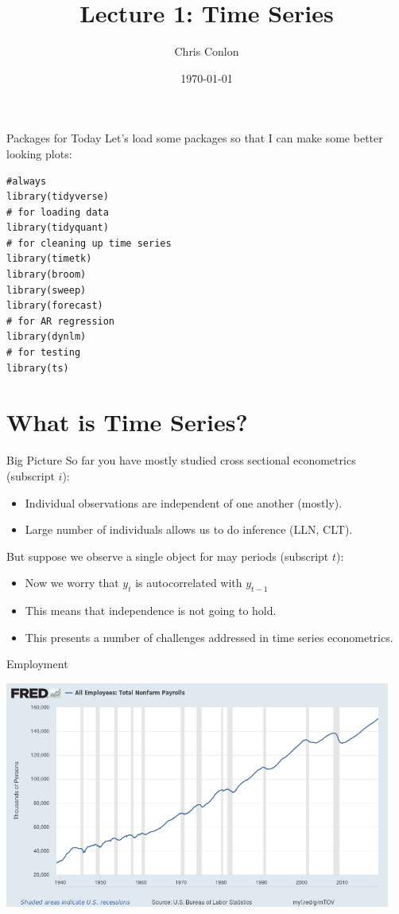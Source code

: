 \documentclass[aspectratio=169]{beamer}
\title{Lecture 1: Time Series}
\author{Chris Conlon }
\institute{NYU Stern }
\date{\today}
\begin{document}
\maketitle

\begin{frame}[fragile]{Packages for Today}
Let's load some packages so that I can make some better looking plots:\\
\begin{verbatim}
#always
library(tidyverse)
# for loading data
library(tidyquant)
# for cleaning up time series
library(timetk)
library(broom)
library(sweep)
library(forecast)
# for AR regression
library(dynlm)
# for testing
library(ts)
\end{verbatim}
\end{frame}

\section{What is Time Series?}


\begin{frame}{Big Picture}
So far you have mostly studied \alert{cross sectional econometrics} (subscript $i$):
\begin{itemize}
\item Individual observations are \alert{independent} of one another (mostly).
\item Large number of individuals allows us to do inference (LLN, CLT).
\end{itemize}
\vspace{1cm}
But suppose we observe a single object for may periods (subscript $t$):
\begin{itemize}
\item Now we worry that $y_{t}$ is \alert{autocorrelated} with $y_{t-1}$
\item This means that \alert{independence} is not going to hold.
\item This presents a number of challenges addressed in time series econometrics.
\end{itemize}
\end{frame}

\begin{frame}{Employment}
\begin{center}
\includegraphics[width=5in]{./resources/nonfarm_level.png}
\end{center}
\end{frame}
\end{document}
